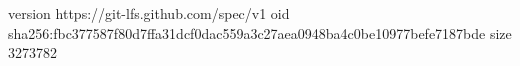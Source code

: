 version https://git-lfs.github.com/spec/v1
oid sha256:fbc377587f80d7ffa31dcf0dac559a3c27aea0948ba4c0be10977befe7187bde
size 3273782
